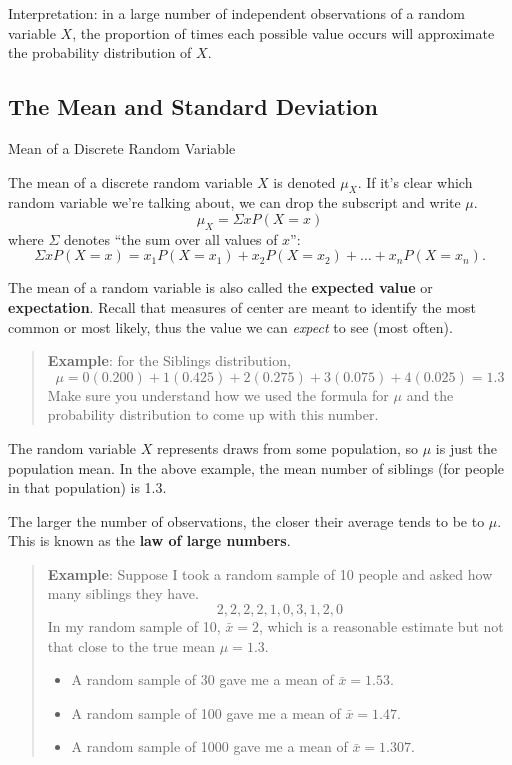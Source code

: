 \documentclass[
]{book}
\providecommand{\tightlist}{%
  \setlength{\itemsep}{0pt}\setlength{\parskip}{0pt}}
\begin{document}
Interpretation: in a large number of independent observations of a random variable \(X\), the proportion of times each possible value occurs will approximate the probability distribution of \(X\).

\subsection{The Mean and Standard Deviation}\label{the-mean-and-standard-deviation}

Mean of a Discrete Random Variable

The mean of a discrete random variable \(X\) is denoted \(\mu_X\). If it's clear which random variable we're talking about, we can drop the subscript and write \(\mu\).
\[
  \mu_X = \Sigma xP(X=x)
\]
where \(\Sigma\) denotes ``the sum over all values of \(x\)'': \[\Sigma xP(X=x) = x_1P(X=x_1) + x_2P(X=x_2) + \dots + x_nP(X=x_n).\]

The mean of a random variable is also called the \textbf{expected value} or \textbf{expectation}. Recall that measures of center are meant to identify the most common or most likely, thus the value we can \emph{expect} to see (most often).

\begin{quote}
\textbf{Example}: for the Siblings distribution, \[\mu = 0(0.200)+1(0.425)+2(0.275)+3(0.075)+4(0.025)=1.3\]
Make sure you understand how we used the formula for \(\mu\) and the probability distribution to come up with this number.
\end{quote}

The random variable \(X\) represents draws from some population, so \(\mu\) is just the population mean. In the above example, the mean number of siblings (for people in that population) is 1.3.

The larger the number of observations, the closer their average tends to be to \(\mu\). This is known as the \textbf{law of large numbers}.

\begin{quote}
\textbf{Example}: Suppose I took a random sample of 10 people and asked how many siblings they have. \[2,2,2,2,1,0,3,1,2,0\] In my random sample of 10, \(\bar{x}=2\), which is a reasonable estimate but not that close to the true mean \(\mu=1.3\).

\begin{itemize}
\tightlist
\item
  A random sample of 30 gave me a mean of \(\bar{x}=1.53\).
\item
  A random sample of 100 gave me a mean of \(\bar{x}=1.47\).
\item
  A random sample of 1000 gave me a mean of \(\bar{x}=1.307\).
\end{itemize}
\end{quote}
\end{document}
